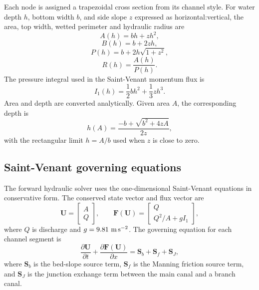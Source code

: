 Each node is assigned a trapezoidal cross section from its channel style. For
water depth \(h\), bottom width \(b\), and side slope \(z\) expressed as
horizontal:vertical, the area, top width, wetted perimeter and hydraulic radius
are
\begin{equation}
    A(h) = bh + zh^2,
\end{equation}
\begin{equation}
    B(h) = b + 2zh,
\end{equation}
\begin{equation}
    P(h) = b + 2h\sqrt{1+z^2},
\end{equation}
\begin{equation}
    R(h) = \frac{A(h)}{P(h)}.
\end{equation}
The pressure integral used in the Saint-Venant momentum flux is
\begin{equation}
    I_1(h) = \frac{1}{2}bh^2 + \frac{1}{3}zh^3.
\end{equation}
Area and depth are converted analytically. Given area \(A\), the corresponding
depth is
\begin{equation}
    h(A) =
    \frac{-b + \sqrt{b^2 + 4zA}}{2z},
\end{equation}
with the rectangular limit \(h=A/b\) used when \(z\) is close to zero.

\subsection{Saint-Venant governing equations}

The forward hydraulic solver uses the one-dimensional Saint-Venant equations in
conservative form. The conserved state vector and flux vector are
\begin{equation}
    \mathbf{U} =
    \left[
    \begin{array}{c}
        A \\
        Q
    \end{array}
    \right],
    \qquad
    \mathbf{F}(\mathbf{U}) =
    \left[
    \begin{array}{c}
        Q \\
        Q^2/A + g I_1
    \end{array}
    \right],
\end{equation}
where \(Q\) is discharge and \(g=9.81\ {\rm m\,s^{-2}}\). The governing equation
for each channel segment is
\begin{equation}
    \frac{\partial \mathbf{U}}{\partial t}
    +
    \frac{\partial \mathbf{F}(\mathbf{U})}{\partial x}
    =
    \mathbf{S}_b + \mathbf{S}_f + \mathbf{S}_J,
\end{equation}
where \(\mathbf{S}_b\) is the bed-slope source term, \(\mathbf{S}_f\) is the
Manning friction source term, and \(\mathbf{S}_J\) is the junction exchange term
between the main canal and a branch canal.

